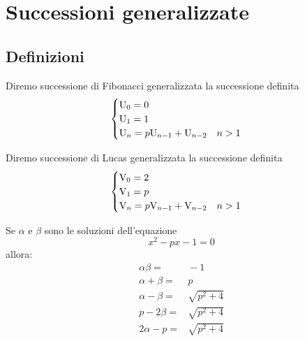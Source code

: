 \chapter{Successioni generalizzate}
\section{Definizioni}
\begin{defn}
	Diremo successione di Fibonacci generalizzata la successione definita
	\begin{equation}
		\begin{cases}
			\mathrm{U}_{0}=0\\
			\mathrm{U}_{1}=1\\
			\mathrm{U}_{n}=p\mathrm{U}_{n-1}+\mathrm{U}_{n-2}\quad n>1\\
		\end{cases}
	\end{equation} 
\end{defn}\cite{Yalciner2013}
\begin{defn}
Diremo successione di Lucas generalizzata la successione definita
\begin{equation}
	\begin{cases}
		\mathrm{V}_{0}=2\\
		\mathrm{V}_{1}=p\\
		\mathrm{V}_{n}=p\mathrm{V}_{n-1}+\mathrm{V}_{n-2}\quad n>1\\
	\end{cases}
\end{equation}
\end{defn}\cite{Yalciner2013} 
\begin{lem}[Proprietà]
	Se $\alpha$ e $\beta$ sono le soluzioni dell'equazione \begin{equation}
		x^2-px-1=0
	\end{equation} allora:
	\begin{align*}
		\alpha\beta=&{}-1\\
		\alpha+\beta=&{}p\\
		\alpha-\beta=&{}\sqrt{p^2+4}\\
		p-2\beta=&{}\sqrt{p^2+4}\\
		2\alpha-p =&{}\sqrt{p^2+4}\\
	\end{align*}
\end{lem}  
